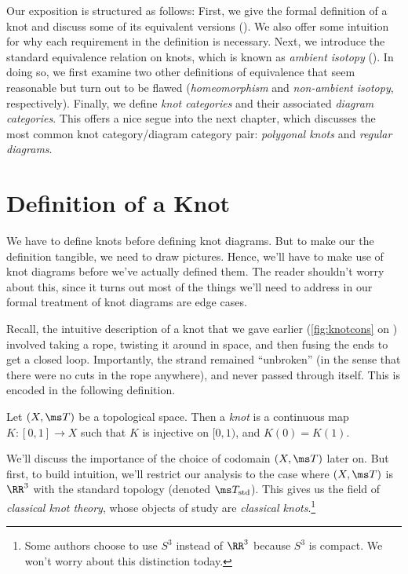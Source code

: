 Our exposition is structured as follows: First, we give the formal
definition of a knot and discuss some of its equivalent versions
(). We also offer some
intuition for why each requirement in the definition is necessary.
Next, we introduce the standard equivalence relation on knots, which
is known as \emph{ambient isotopy}
(). In doing so, we
first examine two other definitions of equivalence that seem
reasonable but turn out to be flawed (\emph{homeomorphism} and
\emph{non-ambient isotopy}, respectively). Finally, we define
\emph{knot categories} and their associated \emph{diagram categories}.
This offers a nice segue into the next chapter, which discusses the
most common knot category/diagram category pair: \emph{polygonal
  knots} and \emph{regular diagrams}.

\section{Definition of a Knot}\label{sec:KnotDef}
We have to define knots before defining knot diagrams. But to make our
the definition tangible, we need to draw pictures. Hence, we'll have
to make use of knot diagrams before we've actually defined them. The
reader shouldn't worry about this, since it turns out most of the
things we'll need to address in our formal treatment of knot diagrams
are edge cases.

Recall, the intuitive description of a knot that we gave earlier
(\cref{fig:knotcons} on ) involved taking a
rope, twisting it around in space, and then fusing the ends to get a
closed loop. Importantly, the strand remained ``unbroken'' (in the
sense that there were no cuts in the rope anywhere), and never passed
through itself. This is encoded in the following definition.
\begin{definition}\label{def:GenKnotInt}
  Let $(X, \ms T)$ be a topological space. Then a \emph{knot} is a
  continuous map $K : [0,1] \to X$ such that $K$ is injective on
  $[0,1)$, and $K(0) = K(1)$.
\end{definition}
We'll discuss the importance of the choice of codomain $(X,\ms T)$
later on. But first, to build intuition, we'll restrict our analysis
to the case where $(X, \ms T)$ is $\RR^3$ with the standard topology
(denoted $\ms T_{\rm std}$). This gives us the field of
\emph{classical knot theory}, whose objects of study are
\emph{classical knots}.\footnote{Some authors choose to use $S^3$
  instead of $\RR^3$ because $S^3$ is compact. We won't worry about
  this distinction today.%
}

